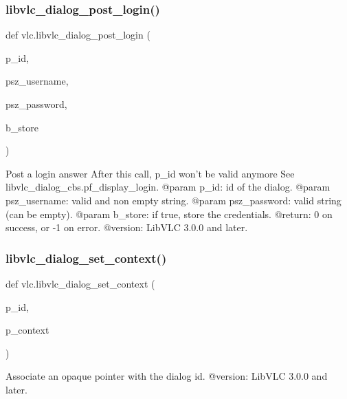 \subsubsection{\texorpdfstring{libvlc\+\_\+dialog\+\_\+post\+\_\+login()}{libvlc\_dialog\_post\_login()}}
{\footnotesize\ttfamily def vlc.\+libvlc\+\_\+dialog\+\_\+post\+\_\+login (\begin{DoxyParamCaption}\item[{}]{p\+\_\+id,  }\item[{}]{psz\+\_\+username,  }\item[{}]{psz\+\_\+password,  }\item[{}]{b\+\_\+store }\end{DoxyParamCaption})}

\begin{DoxyVerb}Post a login answer
After this call, p_id won't be valid anymore
See libvlc_dialog_cbs.pf_display_login.
@param p_id: id of the dialog.
@param psz_username: valid and non empty string.
@param psz_password: valid string (can be empty).
@param b_store: if true, store the credentials.
@return: 0 on success, or -1 on error.
@version: LibVLC 3.0.0 and later.
\end{DoxyVerb}
 \mbox{\label{namespacevlc_ae2518de4fc487b909f150484dbf7b457}} 
\subsubsection{\texorpdfstring{libvlc\+\_\+dialog\+\_\+set\+\_\+context()}{libvlc\_dialog\_set\_context()}}
{\footnotesize\ttfamily def vlc.\+libvlc\+\_\+dialog\+\_\+set\+\_\+context (\begin{DoxyParamCaption}\item[{}]{p\+\_\+id,  }\item[{}]{p\+\_\+context }\end{DoxyParamCaption})}

\begin{DoxyVerb}Associate an opaque pointer with the dialog id.
@version: LibVLC 3.0.0 and later.
\end{DoxyVerb}
 \mbox{\label{namespacevlc_a850485fc3bc6fa1c7a93adfd2ac93f2b}} 
